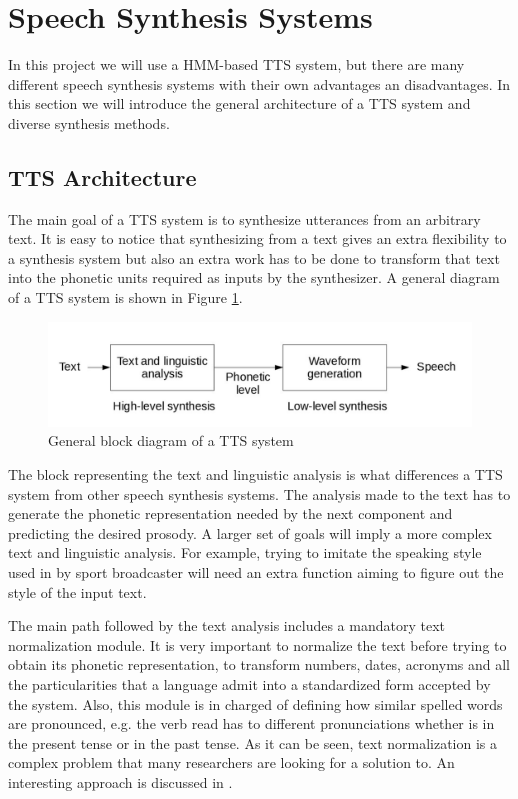 \section{Speech Synthesis Systems}
\label{speec_synthesis_systems}
In this project we will use a HMM-based TTS system, but there are many different speech synthesis systems with their own advantages an disadvantages. In this section we will introduce the general architecture of a TTS system and diverse synthesis methods.

\subsection{TTS Architecture}
The main goal of a TTS system is to synthesize utterances from an arbitrary text. It is easy to notice that synthesizing from a text gives an extra flexibility to a synthesis system but also an extra work has to be done to transform that text into the phonetic units required as inputs by the synthesizer. A general diagram of a TTS system is shown in Figure \ref{fig:tts_architecture}.

\begin{figure}[htb]
	\begin{center}
	\includegraphics[width=\textwidth]{images/tts_architecture.jpg}
	\caption{General block diagram of a TTS system \cite{TuomoMSc}}
	\label{fig:tts_architecture}
	\end{center}
\end{figure}

The block representing the text and linguistic analysis is what differences a TTS system from other speech synthesis systems. The analysis made to the text has to generate the phonetic representation needed by the next component and predicting the desired prosody. A larger set of goals will imply a more complex text and linguistic analysis. For example, trying to imitate the speaking style used in by sport broadcaster will need an extra function aiming to figure out the style of the input text. 

The main path followed by the text analysis includes a mandatory text normalization module. It is very important to normalize the text before trying to obtain its phonetic representation, to transform numbers, dates, acronyms and all the particularities that a language admit into a standardized form accepted by the system. Also, this module is in charged of defining how similar spelled words are pronounced, e.g. the verb read has to different pronunciations whether is in the present tense or in the past tense. As it can be seen, text normalization is a complex problem that many researchers are looking for a solution to. An interesting approach is discussed in \cite{Sproat2001}.

